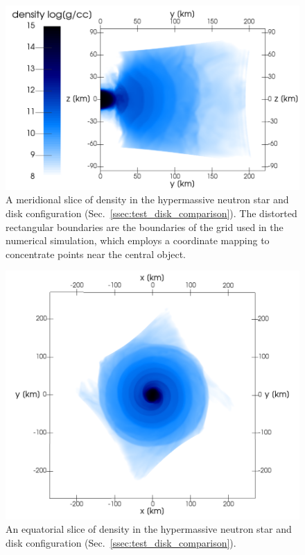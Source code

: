 \documentclass[aps,floatfix,prd,superscriptaddress,twocolumn]{revtex4-1}
\begin{document}
\begin{figure}
  \includegraphics[width=\columnwidth]{production-colormap-merid-rho}
  \caption{A meridional slice of density in the hypermassive neutron
    star and disk configuration (Sec.~\ref{ssec:test_disk_comparison}).
    The distorted rectangular boundaries are the boundaries of the grid
    used in the numerical simulation, which employs a coordinate mapping to
    concentrate points near the central object.}
  \label{fig:nsns_rho_merid}
\end{figure}

\begin{figure}
  \includegraphics[width=\columnwidth]{production-colormap-equat-rho}
  \caption{An equatorial slice of density in the hypermassive neutron
    star and disk configuration (Sec.~\ref{ssec:test_disk_comparison}).}
  \label{fig:nsns_rho_equat}
\end{figure}
\end{document}

